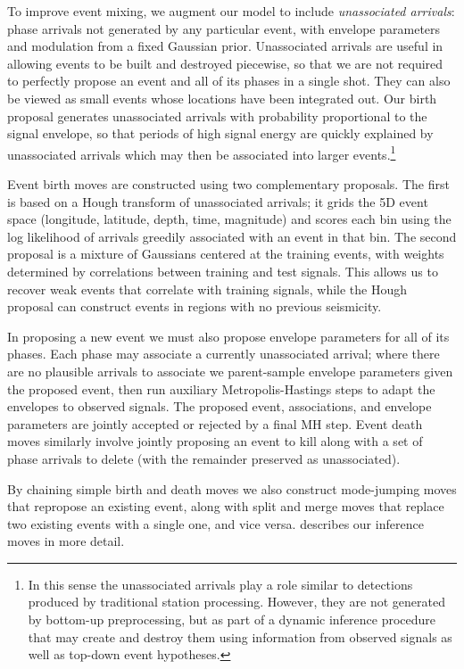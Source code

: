 \documentclass[twoside]{article} \usepackage{aistats2017}
\begin{document}
To improve event mixing, we augment our model to include {\em unassociated
  arrivals}: phase arrivals not generated by any particular event,
with envelope parameters and modulation from a fixed Gaussian
prior. Unassociated arrivals are useful in allowing events to be built
and destroyed piecewise, so that we are not required to perfectly
propose an event and all of its phases in a single shot. They can also be
viewed as small events whose locations have been integrated out. Our birth
proposal generates unassociated arrivals with probability proportional
to the signal envelope, so that periods of high signal energy are
quickly explained by unassociated arrivals which may then be
associated into larger events.\footnote{In this sense the unassociated
arrivals play a role similar to detections produced by traditional
station processing. However, they are not generated by bottom-up
preprocessing, but as part of a dynamic inference procedure that may
create and destroy them using information from observed signals as well as top-down
event hypotheses.}

Event birth moves are constructed using two complementary proposals. The first is based on a
Hough transform of unassociated arrivals; it grids the 5D event space
(longitude, latitude, depth, time, magnitude) and scores each bin
using the log likelihood of arrivals greedily associated with an event
in that bin. The second proposal is a mixture of Gaussians centered at
the training events, with weights determined by correlations between
training and test signals. This allows us to recover weak events
that correlate with training signals, while the Hough proposal can construct events in regions with no previous seismicity. 

In proposing a new event we must also propose envelope parameters for
all of its phases. Each phase may associate a currently unassociated arrival; where
there are no plausible arrivals to associate we parent-sample envelope
parameters given the proposed event, then run auxiliary Metropolis-Hastings steps
\citep{storvik2011} to adapt the envelopes to observed signals. The
proposed event, associations, and envelope parameters are jointly accepted or
rejected by a final MH step. Event death moves similarly involve
jointly proposing an event to kill along with a set of phase arrivals
to delete (with the remainder preserved as unassociated). 

By chaining simple birth and death moves we also construct
mode-jumping moves that repropose an existing event, along with split
and merge moves that replace two existing events with a single one, and
vice versa. \citet{moore2016signal} describes our inference moves in
more detail. 
\end{document}
